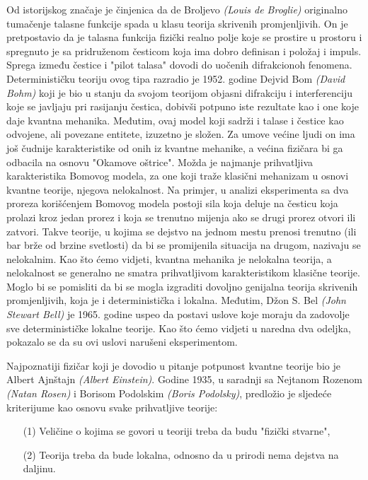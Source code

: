 Od istorijskog značaje je činjenica da de Broljevo {\it{(Louis de Broglie)}} originalno
tumačenje talasne funkcije spada u klasu teorija skrivenih promjenljivih. On je
pretpostavio da je talasna funkcija fizički realno polje koje se prostire u prostoru
i spregnuto je sa pridruženom česticom koja ima dobro definisan i položaj i impuls.
Sprega između čestice i "pilot talasa" dovodi do uočenih difrakcionoh fenomena.
Determinističku teoriju ovog tipa razradio je 1952. godine Dejvid Bom {\it{(David Bohm)}}
koji je bio u stanju da svojom teorijom objasni difrakciju i interferenciju koje se
javljaju pri rasijanju čestica, dobivši potpuno iste rezultate kao i one koje daje
kvantna mehanika. Međutim, ovaj model koji sadrži i talase i čestice kao odvojene,
ali povezane entitete, izuzetno je složen. Za umove većine ljudi on ima još čudnije
karakteristike od onih iz kvantne mehanike, a većina fizičara bi ga odbacila na
osnovu "Okamove oštrice". Možda je najmanje prihvatljiva karakteristika Bomovog
modela, za one koji traže klasični mehanizam u osnovi kvantne teorije, njegova
nelokalnost. Na primjer, u analizi eksperimenta sa dva proreza korišćenjem Bomovog
modela postoji sila koja deluje na česticu koja prolazi kroz jedan prorez i koja se
trenutno mijenja ako se drugi prorez otvori ili zatvori. Takve teorije, u kojima se dejstvo na jednom mestu prenosi trenutno (ili bar brže od brzine svetlosti) da bi se
promijenila situacija na drugom, nazivaju se nelokalnim. Kao što ćemo vidjeti, kvantna
mehanika je nelokalna teorija, a nelokalnost se generalno ne smatra prihvatljivom
karakteristikom klasične teorije. Moglo bi se pomisliti da bi se mogla izgraditi
dovoljno genijalna teorija skrivenih promjenljivih, koja je i deterministička i
lokalna. Međutim, Džon S. Bel {\it{(John Stewart Bell)}} je 1965. godine uspeo da postavi
uslove koje moraju da zadovolje sve determinističke lokalne teorije. Kao što ćemo
vidjeti u naredna dva odeljka, pokazalo se da su ovi uslovi narušeni eksperimentom.

Najpoznatiji fizičar koji je dovodio u pitanje potpunost kvantne teorije bio je
Albert Ajnštajn {\it{(Albert Einstein)}}. Godine 1935, u saradnji sa Nejtanom Rozenom
{\it{(Natan Rosen)}} i Borisom Podolskim {\it{(Boris Podolsky)}}, predložio je sljedeće kriterijume
kao osnovu svake prihvatljive teorije:

\begin{enumerate}
    \item[(1)] Veličine o kojima se govori u teoriji treba da budu "fizički stvarne",
    \item[(2)] Teorija treba da bude lokalna, odnosno da u prirodi nema dejstva na daljinu.
\end{enumerate}

